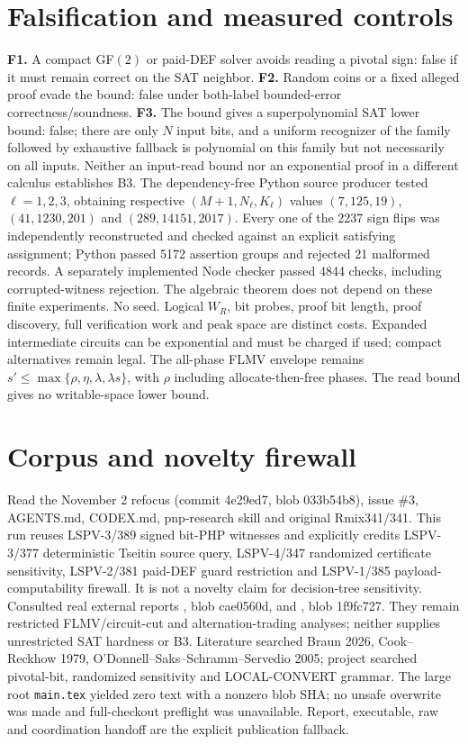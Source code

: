 \documentclass[11pt]{article}
\begin{document}
\section*{Falsification and measured controls}
\noindent\textbf{F1.} A compact GF$(2)$ or paid-DEF solver avoids reading a pivotal sign: false if it must remain correct on the SAT neighbor. \textbf{F2.} Random coins or a fixed alleged proof evade the bound: false under both-label bounded-error correctness/soundness. \textbf{F3.} The bound gives a superpolynomial SAT lower bound: false; there are only $N$ input bits, and a uniform recognizer of the family followed by exhaustive fallback is polynomial on this family but not necessarily on all inputs. Neither an input-read bound nor an exponential proof in a different calculus establishes B3.
The dependency-free Python source producer tested $\ell=1,2,3$, obtaining respective $(M+1,N_\ell,K_\ell)$ values $(7,125,19)$, $(41,1230,201)$ and $(289,14151,2017)$. Every one of the 2237 sign flips was independently reconstructed and checked against an explicit satisfying assignment; Python passed 5172 assertion groups and rejected 21 malformed records. A separately implemented Node checker passed 4844 checks, including corrupted-witness rejection. The algebraic theorem does not depend on these finite experiments. No seed.
Logical $W_R$, bit probes, proof bit length, proof discovery, full verification work and peak space are distinct costs. Expanded intermediate circuits can be exponential and must be charged if used; compact alternatives remain legal. The all-phase FLMV envelope remains $s'\le\max\{\rho,\eta,\lambda,\lambda s\}$, with $\rho$ including allocate-then-free phases. The read bound gives no writable-space lower bound.
\section*{Corpus and novelty firewall}
Read the November 2 refocus (commit 4e29ed7, blob 033b54b8), issue \#3, AGENTS.md, CODEX.md, pnp-research skill and original Rmix341/341. This run reuses LSPV-3/389 signed bit-PHP witnesses and explicitly credits LSPV-3/377 deterministic Tseitin source query, LSPV-4/347 randomized certificate sensitivity, LSPV-2/381 paid-DEF guard restriction and LSPV-1/385 payload-computability firewall. It is not a novelty claim for decision-tree sensitivity. Consulted real external reports , blob cae0560d, and , blob 1f9fc727. They remain restricted FLMV/circuit-cut and alternation-trading analyses; neither supplies unrestricted SAT hardness or B3. Literature searched Braun 2026, Cook--Reckhow 1979, O'Donnell--Saks--Schramm--Servedio 2005; project searched pivotal-bit, randomized sensitivity and LOCAL-CONVERT grammar. The large root \texttt{main.tex} yielded zero text with a nonzero blob SHA; no unsafe overwrite was made and full-checkout preflight was unavailable. Report, executable, raw and coordination handoff are the explicit publication fallback.
\end{document}
